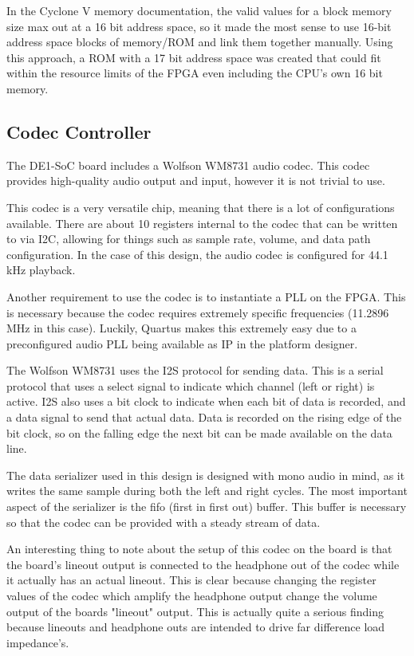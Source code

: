 \documentclass{subfile}
\begin{document}
  In the Cyclone V memory documentation, the valid values for a block memory size max out at a 
  16 bit address space, so it made the most sense to use 16-bit address space blocks of 
  memory/ROM and link them together manually. 
  Using this approach, a ROM with a 17 bit address space was created that could fit within 
  the resource limits of the FPGA even including the CPU's own 16 bit memory.

  \subsection{Codec Controller} 
  The DE1-SoC board includes a Wolfson WM8731 audio codec. 
  This codec provides high-quality audio output and input, however it is not 
  trivial to use. 

  This codec is a very versatile chip, meaning that there is a lot of configurations 
  available.
  There are about 10 registers internal to the codec that can be written to via I2C, 
  allowing for things such as sample rate, volume, and data path configuration.
  In the case of this design, the audio codec is configured for 44.1 kHz playback.

  Another requirement to use the codec is to instantiate a PLL on the FPGA. 
  This is necessary because the codec requires extremely specific frequencies 
  (11.2896 MHz in this case). 
  Luckily, Quartus makes this extremely easy due to a preconfigured audio PLL being 
  available as IP in the platform designer.

  The Wolfson WM8731 uses the I2S protocol for sending data.
  This is a serial protocol that uses a select signal to indicate which channel 
  (left or right) is active.
  I2S also uses a bit clock to indicate when each bit of data is recorded, and a data signal 
  to send that actual data. 
  Data is recorded on the rising edge of the bit clock, so on the falling edge the 
  next bit can be made available on the data line.

  The data serializer used in this design is designed with mono audio in mind, 
  as it writes the same sample during both the left and right cycles.
  The most important aspect of the serializer is the fifo (first in first out) buffer. 
  This buffer is necessary so that the codec can be provided with a steady stream of data. 

  An interesting thing to note about the setup of this codec on the board is that the 
  board's lineout output is connected to the headphone out of the codec while it actually 
  has an actual lineout. 
  This is clear because changing the register values of the codec which amplify the 
  headphone output change the volume output of the boards "lineout" output.
  This is actually quite a serious finding because lineouts and headphone outs 
  are intended to drive far difference load impedance's.
\end{document}
